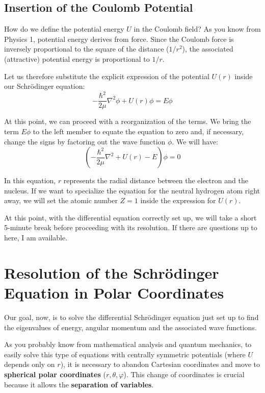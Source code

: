\subsection{Insertion of the Coulomb Potential}

How do we define the potential energy $U$ in the Coulomb field?
As you know from Physics 1, potential energy derives from force. Since the Coulomb force is inversely proportional to the square of the distance ($1/r^2$), the associated (attractive) potential energy is proportional to $1/r$.

Let us therefore substitute the explicit expression of the potential $U(r)$ inside our Schrödinger equation:
\begin{equation}
-\frac{\hbar^2}{2\mu} \nabla^2 \phi + U(r) \phi = E \phi
\end{equation}

At this point, we can proceed with a reorganization of the terms. We bring the term $E \phi$ to the left member to equate the equation to zero and, if necessary, change the signs by factoring out the wave function $\phi$. We will have:
\begin{equation}
\left( -\frac{\hbar^2}{2\mu} \nabla^2 + U(r) - E \right) \phi = 0
\end{equation}

In this equation, $r$ represents the radial distance between the electron and the nucleus.
If we want to specialize the equation for the neutral hydrogen atom right away, we will set the atomic number $Z = 1$ inside the expression for $U(r)$.

At this point, with the differential equation correctly set up, we will take a short 5-minute break before proceeding with its resolution. If there are questions up to here, I am available.

\section{Resolution of the Schrödinger Equation in Polar Coordinates}

Our goal, now, is to solve the differential Schrödinger equation just set up to find the eigenvalues of energy, angular momentum and the associated wave functions.

As you probably know from mathematical analysis and quantum mechanics, to easily solve this type of equations with centrally symmetric potentials (where $U$ depends only on $r$), it is necessary to abandon Cartesian coordinates and move to \textbf{spherical polar coordinates} ($r, \theta, \varphi$).
This change of coordinates is crucial because it allows the \textbf{separation of variables}.

